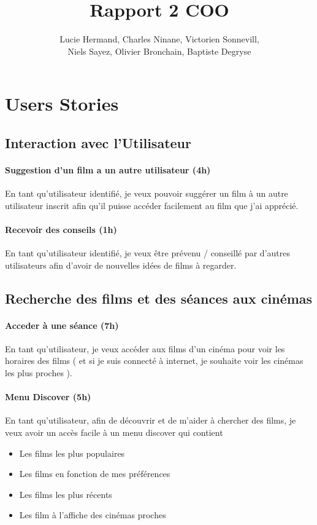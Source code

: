 \documentclass[a4paper,12pt]{article}
\begin{document}
\title{Rapport 2 COO}
\author{Lucie Hermand, Charles Ninane, Victorien Sonnevill, \\ Niels Sayez, Olivier Bronchain, Baptiste Degryse}

\maketitle
\section{Users Stories}
\subsection{Interaction avec l'Utilisateur}

\paragraph{Suggestion d'un film a un autre utilisateur (4h)}
En tant qu'utilisateur identifié, je veux pouvoir suggérer un film à un autre utilisateur inscrit afin qu'il puisse accéder facilement au film que j'ai apprécié.

\paragraph{Recevoir des conseils (1h)}
En tant qu'utilisateur identifié, je veux être prévenu / conseillé par d'autres utilisateurs afin d'avoir de nouvelles idées de films à regarder.

\subsection{Recherche des films et des séances aux cinémas}

\paragraph{Acceder à une séance (7h)}
En tant qu'utilisateur, je veux accéder aux films d'un cinéma pour voir les horaires des films ( et si je suis connecté à internet, je souhaite voir les cinémas les plus proches ).

\paragraph{Menu Discover (5h)}
En tant qu'utilisateur, afin de découvrir et de m'aider à chercher des films, je veux avoir un accès facile à un menu discover qui contient 
\begin{itemize}
\item Les films les plus populaires
\item Les films en fonction de mes préférences
\item Les films les plus récents
\item Les film à l'affiche des cinémas proches
\end{itemize}
\end{document}
